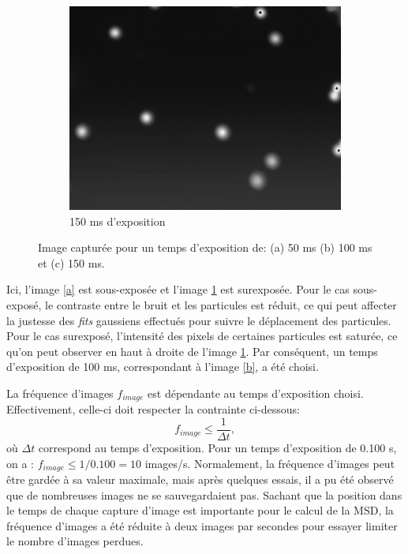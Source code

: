 \documentclass[11pt,letterpaper]{article}
\begin{document}
\begin{figure}[H]
\begin{subfigure}{0.3\textwidth}
    \includegraphics[width=\textwidth]{essai_10um_1im_150ms.png}
    \caption{150 ms d'exposition}
    \label{c}
  \end{subfigure}
  \caption{Image capturée pour un temps d'exposition de: (a) 50 ms (b) 100 ms et (c) 150 ms.}
      \label{exposition}
\end{figure}
Ici, l'image \ref{a} est sous-exposée et l'image \ref{c} est surexposée. Pour le cas sous-exposé, le contraste entre
le bruit et les particules est réduit, ce qui peut affecter la justesse des \textit{fits} gaussiens effectués pour suivre
le déplacement des particules. Pour le cas surexposé, l'intensité des pixels de certaines particules est saturée, ce qu'on peut
observer en haut à droite de l'image \ref{c}. Par conséquent, un temps d'exposition de 100 ms, correspondant à l'image \ref{b}, a été choisi.

La fréquence d'images $f_{image}$ est dépendante au temps d'exposition choisi. Effectivement, celle-ci doit respecter la contrainte
ci-dessous:
\begin{equation*}
  f_{image}\leq \frac{1}{\Delta t},
\end{equation*}
où $\Delta t$ correspond au temps d'exposition. Pour un temps d'exposition de 0.100 s, on a : $f_{image}\leq 1/0.100 = 10$ images/s. 
Normalement, la fréquence d'images peut être gardée à sa valeur maximale, mais après quelques essais, il a pu été observé que de nombreuses
images ne se sauvegardaient pas. Sachant que la position dans le temps de chaque capture d'image est importante pour le calcul de la MSD, la fréquence 
d'images a été réduite à deux images par secondes pour essayer limiter le nombre d'images perdues. 
\end{document}
